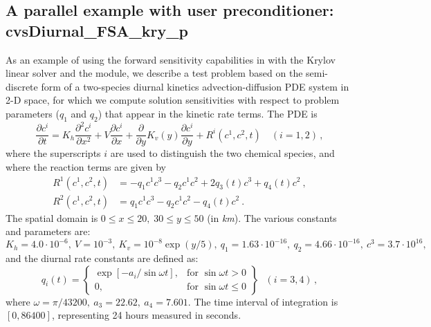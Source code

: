 \newpage
\subsection{A parallel example with user preconditioner: cvsDiurnal\_FSA\_kry\_p}
\label{ss:cvsDiurnal_FSA_kry_p}

As an example of using the forward sensitivity capabilities in {\cvodes} 
with the Krylov linear solver {\cvspgmr} and the {\nvecp} module, 
we describe a test problem based on the
semi-discrete form of a two-species diurnal kinetics advection-diffusion PDE 
system in 2-D space, for which we compute solution sensitivities with respect to 
problem parameters ($q_1$ and $q_2$) that appear in the kinetic rate terms.
The PDE is
\begin{equation}\label{e:cvsDiurnal_FSA_kry_p_PDE}
  \frac{\partial c^i}{\partial t} = K_h\frac{\partial^2 c^i}{\partial x^2}
  +V \frac{\partial c^i}{\partial x}
  + \frac{\partial} {\partial y} K_v(y) \frac{\partial c^i}{\partial y}
  + R^i(c^1,c^2,t) \quad (i=1,2) \, ,
\end{equation}
where the superscripts $i$ are used to distinguish the two chemical
species, and where the reaction terms are given by
\begin{equation}\label{e:cvsDiurnal_FSA_kry_p_R}
  \begin{split}
    R^1(c^1,c^2,t) & = -q_1c^1c^3-q_2c^1c^2+2q_3(t)c^3+q_4(t)c^2 ~, \\
    R^2(c^1,c^2,t) & = q_1c^1c^3-q_2c^1c^2-q_4(t)c^2 ~.
  \end{split}
\end{equation}
The spatial domain is $0 \leq x \leq 20,\;30 \leq y \leq 50$ (in {\em km}). 
The various constants and parameters are: $K_h=4.0\cdot 10^{-6},
~ V=10^{-3},~ K_v=10^{-8}\exp (y/5),~ q_1=1.63\cdot 10^{-16},
~ q_2=4.66\cdot 10^{-16},~ c^3=3.7\cdot 10^{16},$ and the diurnal
rate constants are defined as:
\begin{equation*}
  q_i(t) = 
  \left\{ \begin{array}{ll}
      \exp [-a_i/\sin \omega t], & \mbox{for } \sin \omega t>0 \\
      0, & \mbox{for } \sin \omega t\leq 0
    \end{array} \right\} ~~~(i=3,4) \, ,
\end{equation*}
where $\omega =\pi /43200, ~ a_3=22.62,~ a_4=7.601.$  The time interval of
integration is $[0, 86400]$, representing 24 hours measured in seconds.

